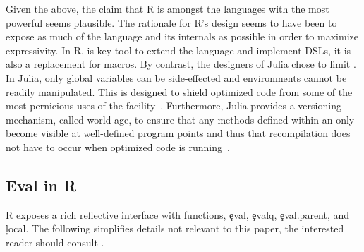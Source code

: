 \documentclass[screen,acmsmall]{acmart}
\begin{document}
Given the above, the claim that R is amongst the languages with the most
powerful \eval seems plausible. The rationale for R's design seems to have been
to expose as much of the language and its internals as possible in order to
maximize expressivity. In R, \eval is key tool to extend the language and
implement DSLs, it is also a replacement for macros. By contrast, the designers
of Julia chose to limit \eval. In Julia, only global variables can be
side-effected and environments cannot be readily manipulated. This is designed
to shield optimized code from some of the most pernicious uses of the
facility~\cite{oopsla18a}. Furthermore, Julia provides a versioning
mechanism, called world age, to ensure that any methods defined within an \eval
only become visible at well-defined program points and thus that recompilation
does not have to occur when optimized code is running~\cite{oopsla20a}.

\subsection{Eval in R}\label{sec:eval-in-r}

R exposes a rich reflective interface with functions, \c{eval},
\c{evalq}, \c{eval.parent}, and \c{local}. The following simplifies details not
relevant to this paper, the interested reader should consult \citet{hadley}.
\end{document}
